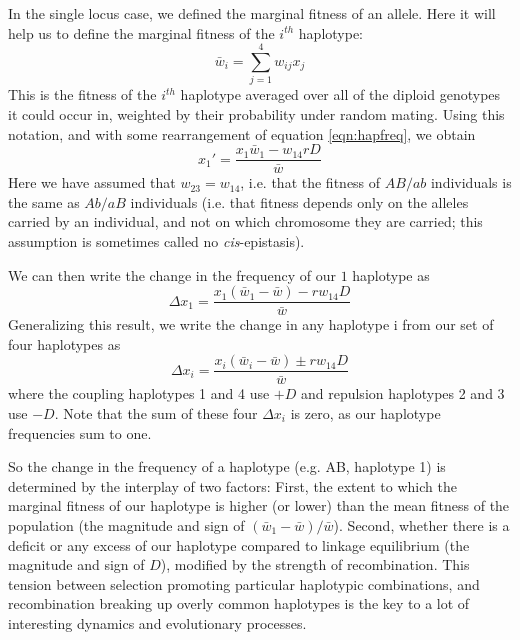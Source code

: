 In the single locus case, we defined the marginal fitness of an allele. Here it will help us to define the marginal fitness of the $i^{th}$ haplotype:
\begin{equation}
\bar{w}_i = \sum_{j=1}^4 w_{ij} x_j
\end{equation}
This is the fitness of the $i^{th}$ haplotype averaged over all of the diploid genotypes it could occur in, weighted by their probability under random mating. Using this notation, and with some rearrangement of equation \eqref{eqn:hapfreq}, we obtain
\begin{equation}
x_1' = \frac{x_1\bar{w}_1 - w_{14} r D}{\bar{w}}
\end{equation}
Here we have assumed that $w_{23}=w_{14}$, i.e. that the fitness of $AB/ab$ individuals is the same as $Ab/aB$ individuals (i.e. that fitness depends only on the alleles carried by an individual, and not on which chromosome they are carried; this assumption is sometimes called no {\it cis}-epistasis). 

We can then write the change in the frequency of our $1$ haplotype as 
\begin{equation}
\Delta x_1= \frac{x_1(\bar{w}_1-\bar{w}) -r w_{14} D}{\bar{w}}
\end{equation}
Generalizing this result, we write the change in any haplotype i from our set of four haplotypes as
\begin{equation}
\Delta x_i= \frac{x_i(\bar{w}_i-\bar{w}) \pm r w_{14} D}{\bar{w}}  \label{eqn:two_loc_sel}
\end{equation}
where the coupling haplotypes 1 and 4 use $+D$ and repulsion haplotypes 2 and 3 use $-D$.  Note that the sum of these four $\Delta x_i$ is zero, as our haplotype frequencies sum to one.

So the change in the frequency of a haplotype (e.g. AB, haplotype 1) is determined by the interplay of two factors: First, the extent to which  the marginal fitness of our haplotype is higher (or lower) than the mean fitness of the population (the magnitude and sign of $(\bar{w}_1-\bar{w})/\bar{w}$). Second, whether there is a deficit or any excess of our haplotype compared to linkage equilibrium (the magnitude and sign of $D$), modified by the strength of recombination. This tension between selection promoting particular haplotypic combinations, and recombination breaking up overly common haplotypes is the key to a lot of interesting dynamics and evolutionary processes.

